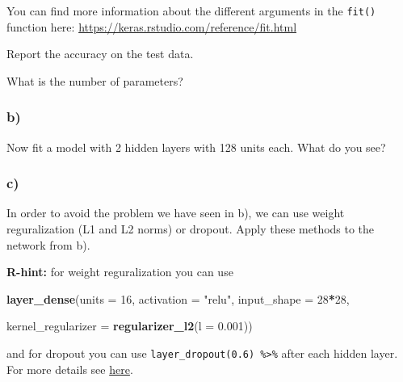 \documentclass[]{article}
\newenvironment{Shaded}{\begin{snugshade}}{\end{snugshade}}
\newcommand{\DataTypeTok}[1]{\textcolor[rgb]{0.13,0.29,0.53}{#1}}
\newcommand{\DecValTok}[1]{\textcolor[rgb]{0.00,0.00,0.81}{#1}}
\newcommand{\FloatTok}[1]{\textcolor[rgb]{0.00,0.00,0.81}{#1}}
\newcommand{\KeywordTok}[1]{\textcolor[rgb]{0.13,0.29,0.53}{\textbf{#1}}}
\newcommand{\NormalTok}[1]{#1}
\newcommand{\OperatorTok}[1]{\textcolor[rgb]{0.81,0.36,0.00}{\textbf{#1}}}
\newcommand{\StringTok}[1]{\textcolor[rgb]{0.31,0.60,0.02}{#1}}
\begin{document}
You can find more information about the different arguments in the
\texttt{fit()} function here:
\url{https://keras.rstudio.com/reference/fit.html}

Report the accuracy on the test data.

\begin{Shaded}
\end{Shaded}

What is the number of parameters?

\hypertarget{b-3}{%
\subsubsection{b)}\label{b-3}}

Now fit a model with 2 hidden layers with 128 units each. What do you
see?

\hypertarget{c-2}{%
\subsubsection{c)}\label{c-2}}

In order to avoid the problem we have seen in b), we can use weight
reguralization (L1 and L2 norms) or dropout. Apply these methods to the
network from b).

\textbf{R-hint:} for weight reguralization you can use

\begin{Shaded}
\begin{Highlighting}[]
\KeywordTok{layer_dense}\NormalTok{(}\DataTypeTok{units =} \DecValTok{16}\NormalTok{, }\DataTypeTok{activation =} \StringTok{"relu"}\NormalTok{, }\DataTypeTok{input_shape =} \DecValTok{28}\OperatorTok{*}\DecValTok{28}\NormalTok{, }
            
            \DataTypeTok{kernel_regularizer =} \KeywordTok{regularizer_l2}\NormalTok{(}\DataTypeTok{l =} \FloatTok{0.001}\NormalTok{))}
\end{Highlighting}
\end{Shaded}

and for dropout you can use
\texttt{layer\_dropout(0.6)\ \%\textgreater{}\%} after each hidden
layer. For more details see
\href{https://keras.rstudio.com/articles/tutorial_overfit_underfit.html}{here}.
\end{document}
